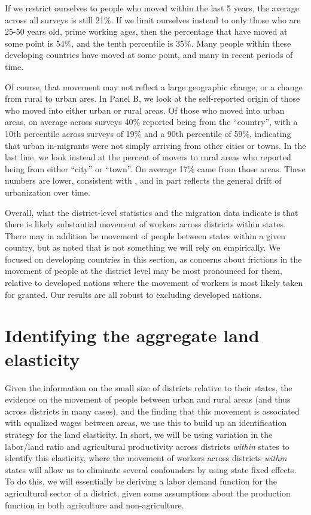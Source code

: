 \documentclass[11pt]{article}
\begin{document}
If we restrict ourselves to people who moved within the last 5 years, the average across all surveys is still 21\%. If we limit ourselves instead to only those who are 25-50 years old, prime working ages, then the percentage that have moved at some point is 54\%, and the tenth percentile is 35\%. Many people within these developing countries have moved at some point, and many in recent periods of time. 

Of course, that movement may not reflect a large geographic change, or a change from rural to urban ares. In Panel B, we look at the self-reported origin of those who moved into either urban or rural areas. Of those who moved into urban areas, on average across surveys 40\% reported being from the ``country'', with a 10th percentile across surveys of 19\% and a 90th percentile of 59\%, indicating that urban in-migrants were not simply arriving from other cities or towns. In the last line, we look instead at the percent of movers to rural areas who reported being from either ``city'' or ``town''. On average 17\% came from those areas. These numbers are lower, consistent with \cite{young2013inequality}, and in part reflects the general drift of urbanization over time.

Overall, what the district-level statistics and the migration data indicate is that there is likely substantial movement of workers across districts within states. There may in addition be movement of people between states within a given country, but as noted that is not something we will rely on empirically. We focused on developing countries in this section, as concerns about frictions in the movement of people at the district level may be most pronounced for them, relative to developed nations where the movement of workers is most likely taken for granted. Our results are all robust to excluding developed nations.

\section{Identifying the aggregate land elasticity}\label{SEC_agmodel}
Given the information on the small size of districts relative to their states, the evidence on the movement of people between urban and rural areas (and thus across districts in many cases), and the finding that this movement is associated with equalized wages between areas, we use this to build up an identification strategy for the land elasticity. In short, we will be using variation in the labor/land ratio and agricultural productivity across districts \textit{within} states to identify this elasticity, where the movement of workers across districts \textit{within} states will allow us to eliminate several confounders by using state fixed effects. To do this, we will essentially be deriving a labor demand function for the agricultural sector of a district, given some assumptions about the production function in both agriculture and non-agriculture.
\end{document}
